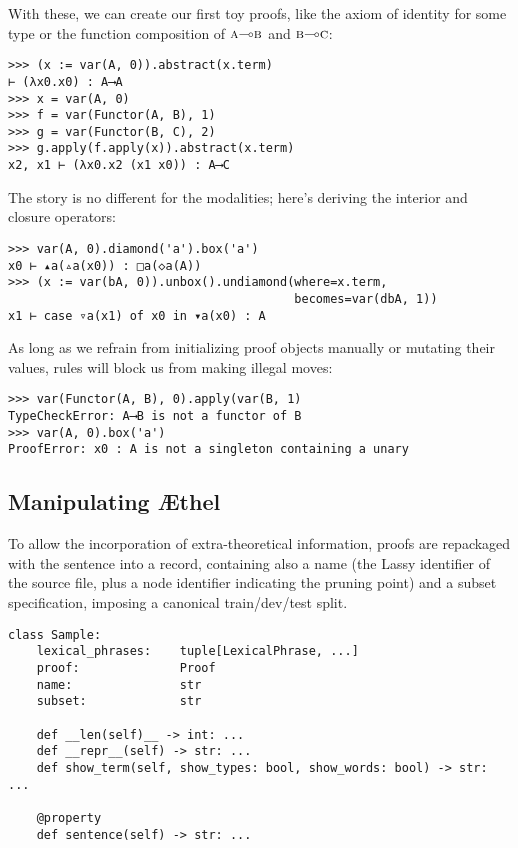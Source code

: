 \noindent With these, we can create our first toy proofs, like the axiom of identity for some type  or the function composition of $\smallprop{a}\li\smallprop{b}$ and $\smallprop{b}\li\smallprop{c}$:
\begin{verbatim}
>>> (x := var(A, 0)).abstract(x.term)
⊢ (λx0.x0) : A⟶A
>>> x = var(A, 0)
>>> f = var(Functor(A, B), 1)
>>> g = var(Functor(B, C), 2)
>>> g.apply(f.apply(x)).abstract(x.term)
x2, x1 ⊢ (λx0.x2 (x1 x0)) : A⟶C
\end{verbatim}

\noindent The story is no different for the modalities; here's deriving the interior and closure operators:
\begin{verbatim}
>>> var(A, 0).diamond('a').box('a')
x0 ⊢ ▴a(▵a(x0)) : □a(◇a(A))
>>> (x := var(bA, 0)).unbox().undiamond(where=x.term, 
                                        becomes=var(dbA, 1))
x1 ⊢ case ▿a(x1) of x0 in ▾a(x0) : A
\end{verbatim}

\noindent As long as we refrain from initializing proof objects manually or mutating their values, rules will block us from making illegal moves:
\begin{verbatim}
>>> var(Functor(A, B), 0).apply(var(B, 1)
TypeCheckError: A⟶B is not a functor of B
>>> var(A, 0).box('a')
ProofError: x0 : A is not a singleton containing a unary
\end{verbatim}

\subsection{Manipulating \AE thel}
\label{subappendix:aethel}
To allow the incorporation of extra-theoretical information, proofs are repackaged with the sentence into a  record, containing also a name (the Lassy identifier of the source file, plus a node identifier indicating the pruning point) and a subset specification, imposing a canonical train/dev/test split.

\begin{verbatim}
class Sample:
    lexical_phrases:    tuple[LexicalPhrase, ...]
    proof:              Proof
    name:               str
    subset:             str

	def __len(self)__ -> int: ...
	def __repr__(self) -> str: ...
    def show_term(self, show_types: bool, show_words: bool) -> str: ...
    
    @property
    def sentence(self) -> str: ...
\end{verbatim}

